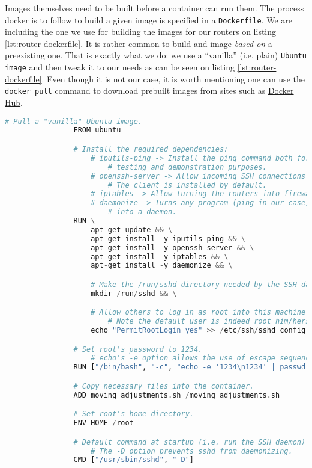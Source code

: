             Images themselves need to be built before a container can run them. The process docker is to follow to build a given image is specified in a \texttt{Dockerfile}. We are including the one we use for building the images for our routers on listing \ref{lst:router-dockerfile}. It is rather common to build and image \textit{based on} a preexisting one. That is exactly what we do: we use a ``vanilla'' (i.e. plain) \texttt{Ubuntu image} and then tweak it to our needs as can be seen on listing \ref{lst:router-dockerfile}. Even though it is not our case, it is worth mentioning one can use the \texttt{docker pull} command to download prebuilt images from sites such as \href{https://hub.docker.com}{Docker Hub}.\\

            \begin{lstlisting}[language = python, caption = \texttt{Dockerfile} for our virtual routers., label = lst:router-dockerfile]
                # Pull a "vanilla" Ubuntu image.
                FROM ubuntu

                # Install the required dependencies:
                    # iputils-ping -> Install the ping command both for
                        # testing and demonstration purposes.
                    # openssh-server -> Allow incoming SSH connections.
                        # The client is installed by default.
                    # iptables -> Allow turning the routers into firewalls.
                    # daemonize -> Turns any program (ping in our case)
                        # into a daemon.
                RUN \
                    apt-get update && \
                    apt-get install -y iputils-ping && \
                    apt-get install -y openssh-server && \
                    apt-get install -y iptables && \
                    apt-get install -y daemonize && \

                    # Make the /run/sshd directory needed by the SSH daemon.
                    mkdir /run/sshd && \

                    # Allow others to log in as root into this machine.
                        # Note the default user is indeed root him/herself.
                    echo "PermitRootLogin yes" >> /etc/ssh/sshd_config

                # Set root's password to 1234.
                    # echo's -e option allows the use of escape sequences (\n).
                RUN ["/bin/bash", "-c", "echo -e '1234\n1234' | passwd root"]

                # Copy necessary files into the container.
                ADD moving_adjustments.sh /moving_adjustments.sh

                # Set root's home directory.
                ENV HOME /root

                # Default command at startup (i.e. run the SSH daemon).
                    # The -D option prevents sshd from daemonizing.
                CMD ["/usr/sbin/sshd", "-D"]
            \end{lstlisting}

